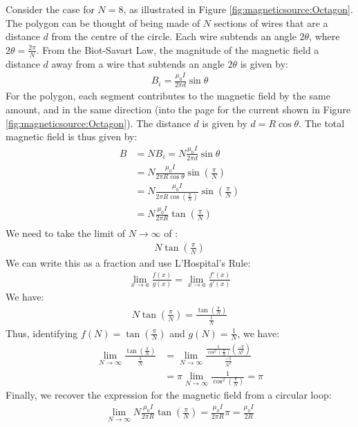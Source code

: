 \begin{solution}
Consider the case for $N=8$, as illustrated in Figure \ref{fig:magneticsource:Octagon}.
The polygon can be thought of being made of $N$ sections of wires that are a distance $d$ from the centre of the circle. Each wire subtends an angle $2\theta$, where $2\theta=\frac{2\pi}{N}$. From the Biot-Savart Law, the magnitude of the magnetic field a distance $d$ away from a wire that subtends an angle $2\theta$ is given by:
\begin{align*}
B_i=\frac{\mu_0I}{2\pi d}\sin\theta
\end{align*}
For the polygon, each segment contributes to the magnetic field by the same amount, and in the same direction (into the page for the current shown in Figure \ref{fig:magneticsource:Octagon}). The distance $d$ is given by $d=R\cos\theta$. The total magnetic field is thus given by:
\begin{align*}
B&=NB_i=N\frac{\mu_0I}{2\pi d}\sin\theta\\
&=N\frac{\mu_0I}{2\pi R\cos\theta}\sin\left(\frac{\pi}{N}\right)\\
&=N\frac{\mu_0I}{2\pi R\cos\left(\frac{\pi}{N}\right)}\sin\left(\frac{\pi}{N}\right)\\
&=N\frac{\mu_0I}{2\pi R}\tan\left(\frac{\pi}{N}\right)\\
\end{align*}
We need to take the limit of $N\to\infty$ of :
\begin{align*}
N\tan\left(\frac{\pi}{N}\right)
\end{align*}
We can write this as a fraction and use L'Hospital's Rule:
\begin{align*}
\lim_{x\to a}\frac{f(x)}{g(x)}=\lim_{x\to a}\frac{f'(x)}{g'(x)}
\end{align*}
We have:
\begin{align*}
N\tan\left(\frac{\pi}{N}\right)=\frac{\tan\left(\frac{\pi}{N}\right)}{\frac{1}{N}}
\end{align*}
Thus, identifying $f(N)=\tan\left(\frac{\pi}{N}\right)$ and $g(N)=\frac{1}{N}$, we have:
\begin{align*}
\lim_{N\to \infty}\frac{\tan\left(\frac{\pi}{N}\right)}{\frac{1}{N}}&=\lim_{N\to \infty}\frac{\frac{1}{\cos^2\left(\frac{\pi}{N}\right)}\left( \frac{-\pi}{N^2}\right)}{\frac{-1}{N^2}}\\
&=\pi\lim_{N\to \infty}\frac{1}{\cos^2\left(\frac{\pi}{N}\right)}=\pi
\end{align*}
Finally, we recover the expression for the magnetic field from a circular loop:
\begin{align*}
\lim_{N\to \infty}N\frac{\mu_0I}{2\pi R}\tan\left(\frac{\pi}{N}\right)=\frac{\mu_0I}{2\pi R}\pi=\frac{\mu_0I}{2 R}
\end{align*}
\end{solution}



